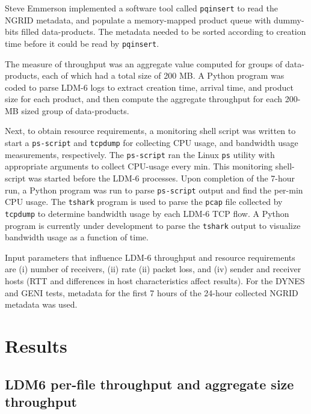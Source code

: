 Steve Emmerson implemented a software tool called \texttt{pqinsert} to read the NGRID metadata, and populate a memory-mapped product queue with dummy-bits filled data-products.  The metadata needed to be
sorted according to creation time before it could be read by \texttt{pqinsert}. 

The measure of throughput was an aggregate value
computed for groups of data-products, each of which had a total size of 200 MB. A Python program was coded
to parse LDM-6 logs to extract creation time, arrival time, and product size for each product,
and then compute the aggregate throughput for each 200-MB sized group of data-products.

Next, to obtain resource requirements, a monitoring shell script was written to start a \texttt{ps-script} and \texttt{tcpdump}
for collecting CPU usage, and bandwidth usage measurements, respectively. The \texttt{ps-script} ran the Linux \texttt{ps} utility with appropriate arguments to collect CPU-usage every min. This monitoring shell-script
was started before the LDM-6 processes.  Upon completion of the 7-hour run, a Python program was run
to parse \texttt{ps-script} output and find the per-min CPU usage. The \texttt{tshark} program is used to
parse the \texttt{pcap} file collected by \texttt{tcpdump} to determine bandwidth usage by each
LDM-6 TCP flow.  A Python program is currently under development to parse the \texttt{tshark} output
to visualize bandwidth usage as a function of time.

Input parameters that influence LDM-6 throughput and resource requirements are (i) number of receivers, (ii) rate (ii) packet loss, and (iv) sender and receiver hosts (RTT and differences in host characteristics affect results).
For the DYNES and GENI tests, metadata for the first 7 hours of the 24-hour collected NGRID metadata was used. 

\section{Results}

\subsection{LDM6 per-file throughput and aggregate size throughput}

